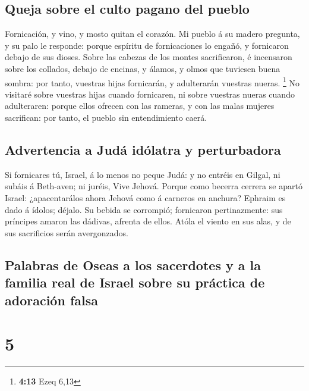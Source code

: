\hypertarget{queja-sobre-el-culto-pagano-del-pueblo}{%
\subsection{Queja sobre el culto pagano del
pueblo}\label{queja-sobre-el-culto-pagano-del-pueblo}}

 Fornicación, y vino, y mosto quitan el corazón.
 Mi pueblo á su madero pregunta, y su palo le responde:
porque espíritu de fornicaciones lo engañó, y fornicaron debajo de sus
dioses.  Sobre las cabezas de los montes sacrificaron, é
incensaron sobre los collados, debajo de encinas, y álamos, y olmos que
tuviesen buena sombra: por tanto, vuestras hijas fornicarán, y
adulterarán vuestras nueras. \footnote{\textbf{4:13} Ezeq 6,13}
 No visitaré sobre vuestras hijas cuando fornicaren, ni
sobre vuestras nueras cuando adulteraren: porque ellos ofrecen con las
rameras, y con las malas mujeres sacrifican: por tanto, el pueblo sin
entendimiento caerá.

\hypertarget{advertencia-a-juduxe1-iduxf3latra-y-perturbadora}{%
\subsection{Advertencia a Judá idólatra y
perturbadora}\label{advertencia-a-juduxe1-iduxf3latra-y-perturbadora}}

 Si fornicares tú, Israel, á lo menos no peque Judá: y no
entréis en Gilgal, ni subáis á Beth-aven; ni juréis, Vive Jehová.
 Porque como becerra cerrera se apartó Israel:
¿apacentarálos ahora Jehová como á carneros en anchura? 
Ephraim es dado á ídolos; déjalo.  Su bebida se
corrompió; fornicaron pertinazmente: sus príncipes amaron las dádivas,
afrenta de ellos.  Atóla el viento en sus alas, y de sus
sacrificios serán avergonzados.

\hypertarget{palabras-de-oseas-a-los-sacerdotes-y-a-la-familia-real-de-israel-sobre-su-pruxe1ctica-de-adoraciuxf3n-falsa}{%
\subsection{Palabras de Oseas a los sacerdotes y a la familia real de
Israel sobre su práctica de adoración
falsa}\label{palabras-de-oseas-a-los-sacerdotes-y-a-la-familia-real-de-israel-sobre-su-pruxe1ctica-de-adoraciuxf3n-falsa}}

\hypertarget{section-4}{%
\section{5}\label{section-4}}

